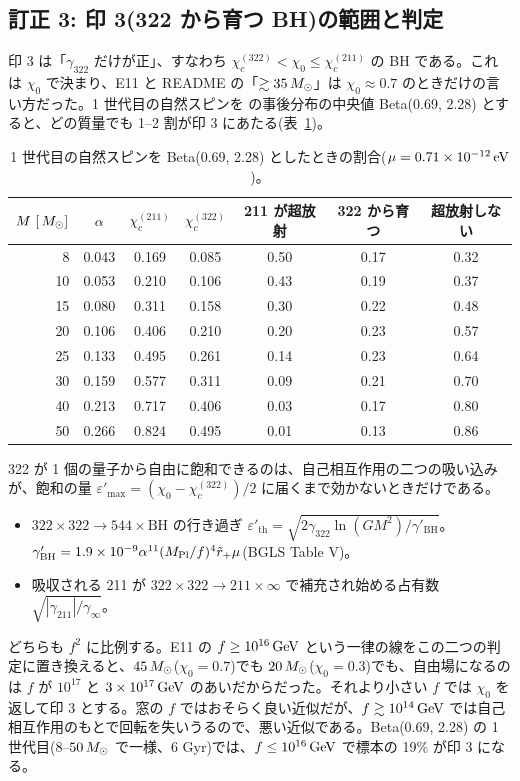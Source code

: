 \subsection{訂正 3: 印 3(322 から育つ BH)の範囲と判定}

印 3 は「$\gamma_{322}$ だけが正」、すなわち $\chi_c^{(322)}<\chi_0\le\chi_c^{(211)}$ の BH である。これは $\chi_0$ で決まり、E11 と README の「$\gtrsim35\,M_\odot$」は $\chi_0\approx0.7$ のときだけの言い方だった。1 世代目の自然スピンを  の事後分布の中央値 Beta(0.69, 2.28) とすると、どの質量でも 1--2 割が印 3 にあたる(表~\ref{tab:e12zone})。

\begin{table}[H]
\centering\small
\begin{tabular}{rcccccc}
\toprule
$M\ [\Msun]$ & $\alpha$ & $\chi_c^{(211)}$ & $\chi_c^{(322)}$ & 211 が超放射 & 322 から育つ & 超放射しない\\
\midrule
8 & 0.043 & 0.169 & 0.085 & 0.50 & 0.17 & 0.32\\
10 & 0.053 & 0.210 & 0.106 & 0.43 & 0.19 & 0.37\\
15 & 0.080 & 0.311 & 0.158 & 0.30 & 0.22 & 0.48\\
20 & 0.106 & 0.406 & 0.210 & 0.20 & 0.23 & 0.57\\
25 & 0.133 & 0.495 & 0.261 & 0.14 & 0.23 & 0.64\\
30 & 0.159 & 0.577 & 0.311 & 0.09 & 0.21 & 0.70\\
40 & 0.213 & 0.717 & 0.406 & 0.03 & 0.17 & 0.80\\
50 & 0.266 & 0.824 & 0.495 & 0.01 & 0.13 & 0.86\\
\bottomrule
\end{tabular}
\caption{1 世代目の自然スピンを Beta(0.69, 2.28) としたときの割合($\mu=0.71\times10^{-12}\,\mathrm{eV}$)。}
\label{tab:e12zone}
\end{table}

322 が 1 個の量子から自由に飽和できるのは、自己相互作用の二つの吸い込みが、飽和の量 $\varepsilon'_\mathrm{max}=(\chi_0-\chi_c^{(322)})/2$ に届くまで効かないときだけである。
\begin{itemize}
\item $322\times322\to544\times\mathrm{BH}$ の行き過ぎ $\varepsilon'_\mathrm{th}=\sqrt{2\gamma_{322}\ln(GM^2)/\gamma'_\mathrm{BH}}$。$\gamma'_\mathrm{BH}=1.9\times10^{-9}\alpha^{11}(M_\mathrm{Pl}/f)^4\tilde r_+\mu$(BGLS Table V)。
\item 吸収される 211 が $322\times322\to211\times\infty$ で補充され始める占有数 $\sqrt{|\gamma_{211}|/\gamma_\infty}$。
\end{itemize}
どちらも $f^2$ に比例する。E11 の $f\ge10^{16}\,\mathrm{GeV}$ という一律の線をこの二つの判定に置き換えると、$45\,M_\odot$($\chi_0=0.7$)でも $20\,M_\odot$($\chi_0=0.3$)でも、自由場になるのは $f$ が $10^{17}$ と $3\times10^{17}\,\mathrm{GeV}$ のあいだからだった。それより小さい $f$ では $\chi_0$ を返して印 3 とする。窓の $f$ ではおそらく良い近似だが、$f\gtrsim10^{14}\,\mathrm{GeV}$ では自己相互作用のもとで回転を失いうるので、悪い近似である。Beta(0.69, 2.28) の 1 世代目($8$--$50\,M_\odot$ で一様、6 Gyr)では、$f\le10^{16}\,\mathrm{GeV}$ で標本の 19\% が印 3 になる。

